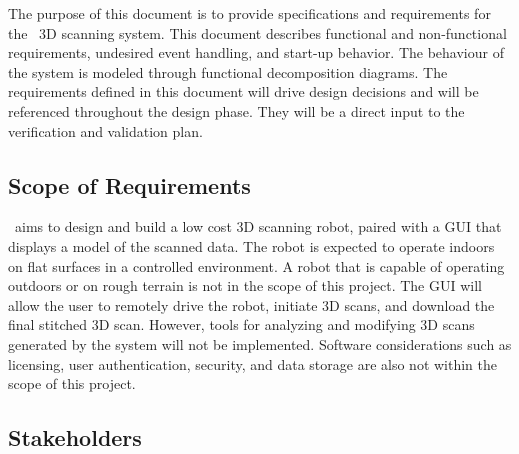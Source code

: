 \documentclass[12pt]{article}
\begin{document}
  The purpose of this document is to provide specifications and requirements for the \progname\ 3D scanning system. This document describes functional and non-functional requirements, undesired event handling, and start-up behavior. The behaviour of the system is modeled through functional decomposition diagrams. The requirements defined in this document will drive design decisions and will be referenced throughout the design phase. They will be a direct input to the verification and validation plan.

\subsection{Scope of Requirements} 
\label{sec_Scope}



\progname\ aims to design and build a low cost 3D scanning robot, paired with a GUI that displays a model of the scanned data.
The robot is expected to operate indoors on flat surfaces in a controlled environment.
A robot that is capable of operating outdoors or on rough terrain is not in the scope of this project.
The GUI will allow the user to remotely drive the robot, initiate 3D scans, and download the final stitched 3D scan.
However, tools for analyzing and modifying 3D scans generated by the system will not be implemented.
Software considerations such as licensing, user authentication, security, and data storage are also not within the scope of this project.

\subsection{Stakeholders}
\end{document}
